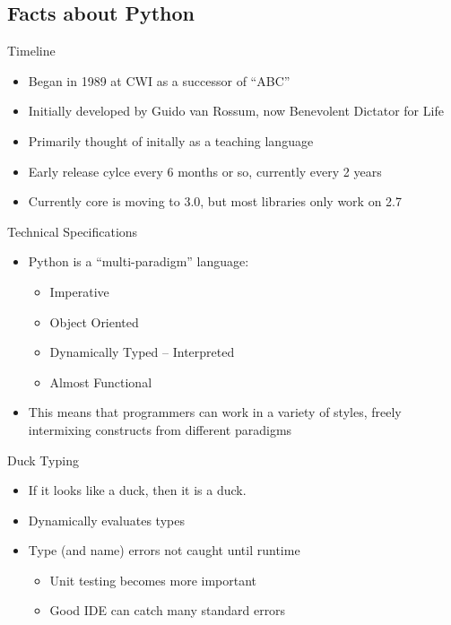 \subsection*{Facts about Python}

\begin{frame}
  Timeline
  \begin{itemize}\itemsep=.25cm
    \item{Began in 1989 at CWI as a successor of ``ABC''}
    \item{Initially developed by Guido van Rossum, now Benevolent Dictator for Life}
    \item{Primarily thought of initally as a teaching language}
    \item{Early release cylce every 6 months or so, currently every 2 years}
    \item{Currently core is moving to 3.0, but most libraries only work on 2.7}
  \end{itemize}
\end{frame}



\begin{frame}
  Technical Specifications
  \begin{itemize}\itemsep=.25cm
    \item{Python is a ``multi-paradigm'' language:
      \begin{itemize}
      \item{Imperative}
      \item{Object Oriented}
      \item{Dynamically Typed -- Interpreted}
      \item{Almost Functional}
      \end{itemize}
    }
  \item{This means that programmers can work in a variety of styles, freely
    intermixing constructs from different paradigms}
  \end{itemize}
\end{frame}

\begin{frame}
  Duck Typing
  \begin{itemize}
  \item If it looks like a duck, then it is a duck.
  \item Dynamically evaluates types
  \item Type (and name) errors not caught until runtime
    \begin{itemize}
    \item Unit testing becomes more important
    \item Good IDE can catch many standard errors
    \end{itemize}
  \end{itemize}
\end{frame}

